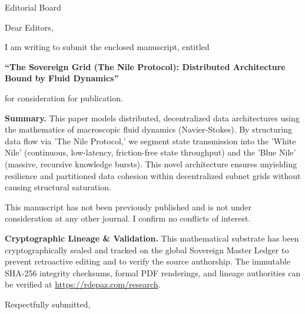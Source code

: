 \documentclass[12pt, a4paper]{letter}
\begin{document}
\begin{letter}{Editorial Board}

\opening{Dear Editors,}

I am writing to submit the enclosed manuscript, entitled

\begin{center}
\textbf{``The Sovereign Grid (The Nile Protocol): Distributed Architecture Bound by Fluid Dynamics''}
\end{center}

\noindent for consideration for publication.

\medskip

\textbf{Summary.} This paper models distributed, decentralized data architectures using the mathematics of macroscopic fluid dynamics (Navier-Stokes). By structuring data flow via 'The Nile Protocol,' we segment state transmission into the 'White Nile' (continuous, low-latency, friction-free state throughput) and the 'Blue Nile' (massive, recursive knowledge bursts). This novel architecture ensures unyielding resilience and partitioned data cohesion within decentralized subnet grids without causing structural saturation.

\medskip

This manuscript has not been previously published and is not under consideration
at any other journal. I confirm no conflicts of interest.

\textbf{Cryptographic Lineage \& Validation.} This mathematical substrate has been cryptographically sealed and tracked on the global Sovereign Master Ledger to prevent retroactive editing and to verify the source authorship. The immutable SHA-256 integrity checksums, formal PDF renderings, and lineage authorities can be verified at \url{https://rdepaz.com/research}.

\medskip

\closing{Respectfully submitted,}
\end{letter}
\end{document}
